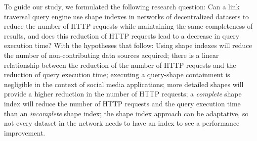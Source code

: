To guide our study, we formulated the following research question:
Can a link traversal query engine use shape indexes in networks of decentralized datasets to reduce the number of HTTP requests while maintaining the same completeness of results, and does this reduction of HTTP requests lead to a decrease in query execution time?
With the hypotheses that follow:
Using shape indexes will reduce the number of non-contributing data sources acquired;
there is a linear relationship between the reduction of the number of HTTP requests and the reduction of query execution time;
executing a query-shape containment is negligible in the context of social media applications; 
more detailed shapes will provide a higher reduction in the number of HTTP requests;
a \emph{complete} shape index will reduce the number of HTTP requests and the query execution time than an \emph{incomplete} shape index;
the shape index approach can be adaptative, so not every dataset in the network needs to have an index to see a performance improvement.
\iffalse
\pc{Started changing these to be more concrete by changing how to by how much or what. What do you think about that? More concrete or worse?}
By how much can this method reduce the ratio of dereferenced non-contributing data sources?
By how much do the fewer HTTP request affect the query execution time?
By how much does the level of detail of the shapes impact the performances?
What is the difference in performance between a \emph{complete} and an \emph{incomplete} shape index?
How does the ratio of subdomains containing an index influence global performances?
How does the fragmentation of the subdomain impact the performance?
How does the quantity of non-query contributing resources impact the performances?
What is the ideal query execution time if we only dereferenced contributing data sources?
\fi
